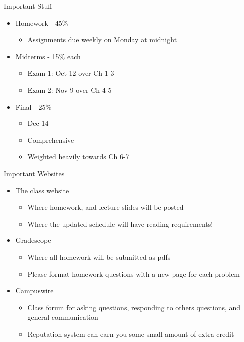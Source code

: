\documentclass[pdf,aspectratio=169]{beamer}
\begin{document}
\begin{frame}{Important Stuff}
	\begin{itemize}
		\item Homework - 45\%
			\begin{itemize}
				\item Assignments due weekly on Monday at midnight
			\end{itemize}
		\item Midterms - 15\% each
			\begin{itemize}
				\item Exam 1: Oct 12 over Ch 1-3
				\item Exam 2: Nov 9 over Ch 4-5
			\end{itemize}
		\item Final - 25\%
			\begin{itemize}
				\item Dec 14
				\item Comprehensive
				\item Weighted heavily towards Ch 6-7
			\end{itemize}
	\end{itemize}
\end{frame}

\begin{frame}{Important Websites}
	\begin{itemize}
		\item The class website
			\begin{itemize}
				\item Where homework, and lecture slides will be posted
				\item Where the updated schedule will have reading requirements!
			\end{itemize}
		\item Gradescope
			\begin{itemize}
				\item Where all homework will be submitted as pdfs
				\item Please format homework questions with a new page for each problem
			\end{itemize}
		\item Campuswire
			\begin{itemize}
				\item Class forum for asking questions, responding to others questions, and general communication
				\item Reputation system can earn you some small amount of extra credit
			\end{itemize}
	\end{itemize}
\end{frame}
\end{document}
